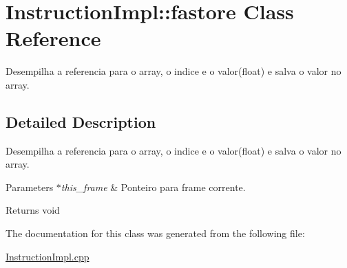 \hypertarget{class_instruction_impl_1_1fastore}{}\section{Instruction\+Impl\+:\+:fastore Class Reference}
\label{class_instruction_impl_1_1fastore}


Desempilha a referencia para o array, o indice e o valor(float) e salva o valor no array.  




\subsection{Detailed Description}
Desempilha a referencia para o array, o indice e o valor(float) e salva o valor no array. 


\begin{DoxyParams}{Parameters}
{\em $\ast$this\+\_\+frame} & Ponteiro para frame corrente. \\
\hline
\end{DoxyParams}
\begin{DoxyReturn}{Returns}
void 
\end{DoxyReturn}


The documentation for this class was generated from the following file\+:\begin{DoxyCompactItemize}
\item 
\hyperlink{_instruction_impl_8cpp}{Instruction\+Impl.\+cpp}\end{DoxyCompactItemize}
